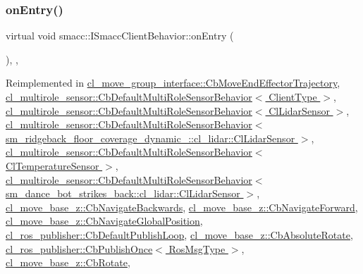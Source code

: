 \subsubsection{\texorpdfstring{on\+Entry()}{onEntry()}}
{\footnotesize\ttfamily virtual void smacc\+::\+I\+Smacc\+Client\+Behavior\+::on\+Entry (\begin{DoxyParamCaption}{ }\end{DoxyParamCaption})\hspace{0.3cm}{\ttfamily [inline]}, {\ttfamily [protected]}, {\ttfamily [virtual]}}



Reimplemented in \hyperlink{classcl__move__group__interface_1_1CbMoveEndEffectorTrajectory_aaedd074fd178c6390a4a3f1ccff23ad3}{cl\+\_\+move\+\_\+group\+\_\+interface\+::\+Cb\+Move\+End\+Effector\+Trajectory}, \hyperlink{classcl__multirole__sensor_1_1CbDefaultMultiRoleSensorBehavior_a5ac29f93cc91e23715f51ade94467cae}{cl\+\_\+multirole\+\_\+sensor\+::\+Cb\+Default\+Multi\+Role\+Sensor\+Behavior$<$ Client\+Type $>$}, \hyperlink{classcl__multirole__sensor_1_1CbDefaultMultiRoleSensorBehavior_a5ac29f93cc91e23715f51ade94467cae}{cl\+\_\+multirole\+\_\+sensor\+::\+Cb\+Default\+Multi\+Role\+Sensor\+Behavior$<$ Cl\+Lidar\+Sensor $>$}, \hyperlink{classcl__multirole__sensor_1_1CbDefaultMultiRoleSensorBehavior_a5ac29f93cc91e23715f51ade94467cae}{cl\+\_\+multirole\+\_\+sensor\+::\+Cb\+Default\+Multi\+Role\+Sensor\+Behavior$<$ sm\+\_\+ridgeback\+\_\+floor\+\_\+coverage\+\_\+dynamic\+\_\+::cl\+\_\+lidar\+::\+Cl\+Lidar\+Sensor $>$}, \hyperlink{classcl__multirole__sensor_1_1CbDefaultMultiRoleSensorBehavior_a5ac29f93cc91e23715f51ade94467cae}{cl\+\_\+multirole\+\_\+sensor\+::\+Cb\+Default\+Multi\+Role\+Sensor\+Behavior$<$ Cl\+Temperature\+Sensor $>$}, \hyperlink{classcl__multirole__sensor_1_1CbDefaultMultiRoleSensorBehavior_a5ac29f93cc91e23715f51ade94467cae}{cl\+\_\+multirole\+\_\+sensor\+::\+Cb\+Default\+Multi\+Role\+Sensor\+Behavior$<$ sm\+\_\+dance\+\_\+bot\+\_\+strikes\+\_\+back\+::cl\+\_\+lidar\+::\+Cl\+Lidar\+Sensor $>$}, \hyperlink{classcl__move__base__z_1_1CbNavigateBackwards_a545a5282f0ef6b0080b46002d6037567}{cl\+\_\+move\+\_\+base\+\_\+z\+::\+Cb\+Navigate\+Backwards}, \hyperlink{classcl__move__base__z_1_1CbNavigateForward_af9a2e49071de287922c3f5963a079b95}{cl\+\_\+move\+\_\+base\+\_\+z\+::\+Cb\+Navigate\+Forward}, \hyperlink{classcl__move__base__z_1_1CbNavigateGlobalPosition_a66d8b0555ef2945bc108dcd5171be292}{cl\+\_\+move\+\_\+base\+\_\+z\+::\+Cb\+Navigate\+Global\+Position}, \hyperlink{classcl__ros__publisher_1_1CbDefaultPublishLoop_a6e6cfb477cbefc510ca7b55a061545e4}{cl\+\_\+ros\+\_\+publisher\+::\+Cb\+Default\+Publish\+Loop}, \hyperlink{classcl__move__base__z_1_1CbAbsoluteRotate_a10418ea360809fa649d295716b152b2b}{cl\+\_\+move\+\_\+base\+\_\+z\+::\+Cb\+Absolute\+Rotate}, \hyperlink{classcl__ros__publisher_1_1CbPublishOnce_afaed71bc2694ec1837278d5f931a76e1}{cl\+\_\+ros\+\_\+publisher\+::\+Cb\+Publish\+Once$<$ Ros\+Msg\+Type $>$}, \hyperlink{classcl__move__base__z_1_1CbRotate_a316ee51ecfd3f10fd1edae0d7d3b26c0}{cl\+\_\+move\+\_\+base\+\_\+z\+::\+Cb\+Rotate}, 